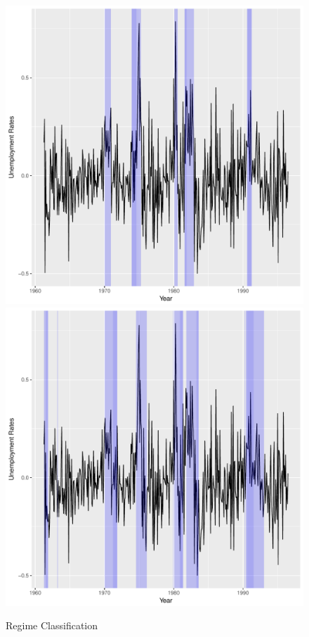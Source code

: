 \documentclass[12pt, reqno]{amsart}
\begin{document}
\begin{figure}[htbp]
	\caption{Regime Classification}
	\label{fig-hansen97}
	\begin{center}
		\graphicspath{ {plot/} }
		\includegraphics[scale=0.37]{UR_nber.pdf} 
		\includegraphics[scale=0.37]{UR_hansen.pdf}

\end{center}
\end{figure}
\end{document}
